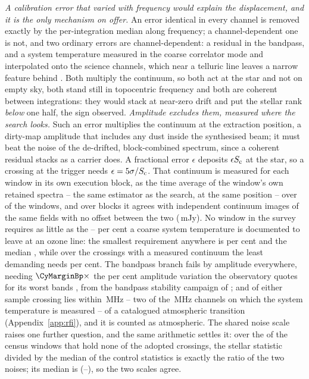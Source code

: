 \emph{A calibration error that varied with frequency would explain the
displacement, and it is the only mechanism on offer.} An error identical in
every channel is removed exactly by the per-integration median along
frequency; a channel-dependent one is not, and two ordinary errors are
channel-dependent: a residual in the bandpass, and a system temperature
measured in the coarse correlator mode and interpolated onto the science
channels, which near a telluric line leaves a narrow feature behind
\citep{ALMATsys2018}. Both
multiply the continuum, so both act at the star and not on empty sky, both
stand still in topocentric frequency and both are coherent between
integrations: they would stack at near-zero drift and put the stellar rank
\emph{below} one half, the sign observed.
\emph{Amplitude excludes them, measured where the search looks.} Such an
error multiplies the continuum at the extraction position, a dirty-map
amplitude that includes any dust inside the synthesised beam; it must beat
the noise of the de-drifted, block-combined spectrum, since a
coherent residual stacks as a carrier does. A fractional error $\epsilon$
deposits $\epsilon S_{\rm c}$ at the star, so a crossing at the trigger needs
$\epsilon=5\sigma/S_{\rm c}$. That continuum is measured for each window in
its own execution block, as the time average of the window's own retained
spectra -- the same estimator as the search, at the same position -- over
\CyNWinMeas{} of the \CyNWinTot{} windows, and over \CyNRouteBlock{} blocks
it agrees with independent continuum images of
the same fields with no offset between the two (\CyRouteBiasMJy\,mJy).
No window in the survey requires as little as the
\CySpecTsysLo--\CySpecTsysHi{} per cent a coarse system temperature is
documented to leave at an ozone line: the smallest requirement anywhere is
\CyEpsMinPct{} per cent and the median \CyEpsMedPct, while over the
\CyNCrossMeas{} crossings with a measured continuum the least demanding
needs \CyCrossEpsLoPct{} per cent. The bandpass branch fails by amplitude
everywhere, needing
$\CyMarginBp\times$ the \CdSpecBpWorst{} per cent amplitude variation the
observatory quotes for its worst bands \citep{ALMAKBBandpass}, from the
bandpass stability campaign of \citet{ALMATechNote15}; and of either sample
\ScNInRad{} crossing lies within \ScRadMHz\,MHz -- two of the
\CdSpecTsysRes\,MHz channels on which the system temperature is measured --
of a catalogued atmospheric transition
(Appendix~\ref{app:rfi}), and it is counted as atmospheric. The shared noise
scale raises one further question, and the same arithmetic settles it: over
the \NsrNWin{} of
the \NWindows{} census windows that hold none of the adopted crossings, the
stellar statistic divided by the median of the \NCtrl{} control
statistics is exactly the ratio of the two noises; its median is \NsrMed{}
(\NsrLo--\NsrHi), so the two scales agree.

